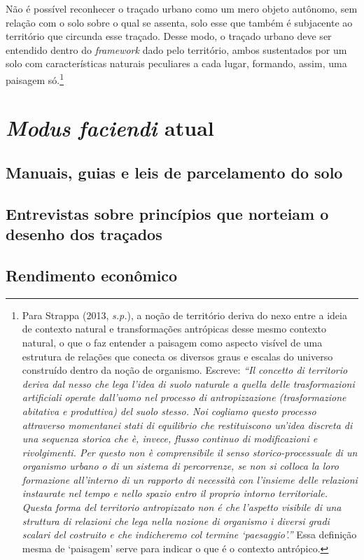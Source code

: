 \documentclass[12pt, a4paper]{book} %
\begin{document}
                Não é possível reconhecer o traçado urbano como um mero objeto autônomo, sem relação com o solo sobre o qual se assenta, solo esse que também é subjacente ao território que circunda esse traçado. Desse modo, o traçado urbano deve ser entendido dentro do \textit{framework} dado pelo território, ambos sustentados por um solo com características naturais peculiares a cada lugar, formando, assim, uma paisagem só.\footnote[13]{Para Strappa (2013, \textit{s.p.}), a noção de território deriva do nexo entre a ideia de contexto natural e transformações antrópicas desse mesmo contexto natural, o que o faz entender a paisagem como aspecto visível de uma estrutura de relações que conecta os diversos graus e escalas do universo construído dentro da noção de organismo. Escreve: \textit{``Il concetto di territorio deriva dal nesso che lega l’idea di suolo naturale a quella delle trasformazioni artificiali operate dall’uomo nel processo di antropizzazione (trasformazione abitativa e produttiva) del suolo stesso. Noi cogliamo questo processo attraverso momentanei stati di equilibrio che  restituiscono un’idea discreta di una sequenza storica che è, invece, flusso continuo di modificazioni e rivolgimenti.
                Per questo non è comprensibile il senso storico-processuale di un organismo urbano o di un sistema di percorrenze, se non si colloca la loro formazione all’interno di un rapporto di necessità con l’insieme delle relazioni instaurate nel tempo e nello spazio entro il proprio intorno territoriale. Questa forma del territorio antropizzato non é che l’aspetto visibile di una struttura di relazioni che lega nella nozione di organismo i diversi gradi scalari del costruito e che indicheremo col termine `paesaggio'.''} Essa definição mesma de `paisagem' serve para indicar o que é o contexto antrópico.}

            \section{\textit{Modus faciendi} atual}
                \subsection{Manuais, guias e leis de parcelamento do solo}
                \subsection{Entrevistas sobre princípios que norteiam o desenho dos traçados}
                \subsection{Rendimento econômico}
\end{document}
